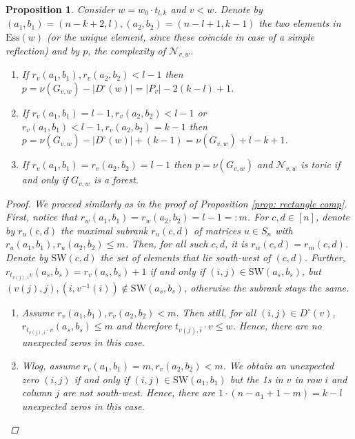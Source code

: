 \documentclass[11pt]{amsart}
\newtheorem{proposition}[theorem]{Proposition}
\theoremstyle{definition}
\theoremstyle{definition}
\theoremstyle{definition}
\theoremstyle{definition}
\newcommand{\SW}{\mathrm{SW}}
\newcommand{\Ess}{\mathrm{Ess}}
\newcommand{\Gvwt}{G_{v,w}}
\newcommand{\Nvw}{\mathcal{N}_{v,w}}
\newcommand{\Dc}{D^{\circ}}
\newcommand{\cn}{\nu}
\newcommand{\rk}{r}
\begin{document}
\begin{proposition}\label{prop: change w for complexity}
Consider $w = w_0\cdot t_{l,k}$ and $v < w$. Denote by $(a_1,b_1)=(n-k+2,l),(a_2,b_2)=(n-l+1,k-1)$ the two elements in $\Ess(w)$ (or the unique element, since these coincide in case of a simple reflection) and by $p$, the complexity of $\Nvw$.
\begin{enumerate}
    \item If $\rk_v(a_1,b_1), \rk_v(a_2,b_2) < l-1$ then $p= \cn(\Gvwt)- |\Dc(w)| = |P_v| - 2(k-l)+1$. 
    \item If $\rk_v(a_1,b_1)= l-1, \rk_v(a_2,b_2) < l-1$ or 
          $\rk_v(a_1,b_1)< l-1, \rk_v(a_2,b_2) =  k-1$
          then $p = \cn(\Gvwt) - |\Dc(w)| + (k-1) = \cn(\Gvwt) +l-k+1$.
    \item If $\rk_v(a_1,b_1) = \rk_v(a_2,b_2) = l-1$ then $p = \cn(\Gvwt)$ and $\Nvw$ is toric if and only if $\Gvwt$ is a forest.
\end{enumerate}
\begin{proof}
    We proceed similarly as in the proof of Proposition \ref{prop: rectangle comp}.
    First, notice that $\rk_w(a_1,b_1)=\rk_w(a_2,b_2) = l-1 =:m$. For $c,d \in [n]$, denote by $\rk_u(c,d)$ the maximal subrank $\rk_u(c,d)$ of matrices $u \in S_n$ with $\rk_u(a_1,b_1), \rk_u(a_2,b_2)\leq m$. Then, for all such $c,d$, it is $\rk_w(c,d)= \rk_m(c,d)$. Denote by $\SW(c,d)$ the set of elements that lie south-west of $(c,d)$.
    Further, $\rk_{t_{v(j),i}v}(a_s,b_s) = \rk_v(a_s,b_s)+1$ if and only if $(i,j)\in \SW(a_s,b_s)$, but $(v(j),j),(i, v^{-1}(i)) \not\in \SW(a_s,b_s)$, otherwise the subrank stays the same.

    \begin{enumerate}
    \item Assume $\rk_v(a_1,b_1), \rk_v(a_2,b_2) < m$. Then still, for all $(i,j) \in \Dc(v)$, $\rk_{t_{v(j),i}\cdot v}(a_s,b_s) \leq m$ and therefore $t_{v(j),i}\cdot v \leq w$. Hence, there are no unexpected zeros in this case.

    \item Wlog, assume $\rk_v(a_1,b_1)= m, \rk_v(a_2,b_2) < m$. We obtain an unexpected zero $(i,j)$ if and only if $(i,j) \in \SW(a_1,b_1)$ but the 1s in $v$ in row $i$ and column $j$ are not south-west. Hence, there are $1 \cdot (n-a_1+1-m) = k-l$ unexpected zeros in this case.


\end{enumerate}
\end{proof}
\end{proposition}
\end{document}
